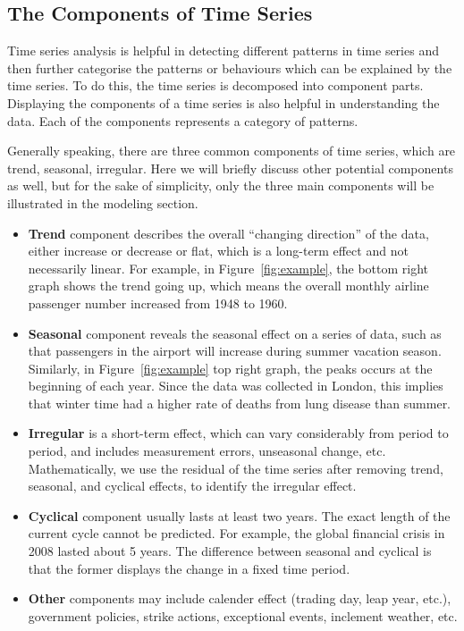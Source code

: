\subsection{The Components of Time Series}
Time series analysis is helpful in detecting different patterns in time series and then further categorise the patterns or behaviours which can be explained by the time series. To do this, the time series is decomposed into component parts. Displaying the components of a time series is also helpful in understanding the data. Each of the components represents a category of patterns.

Generally speaking, there are three common components of time series, which are trend, seasonal, irregular. Here we will briefly discuss other potential components as well, but for the sake of simplicity, only the three main components will be illustrated in the modeling section. 
 \begin{itemize}[noitemsep]
    \item \textbf{Trend} component describes the overall ``changing direction'' of the data, either increase or decrease or flat, which is a long-term effect and not necessarily linear. For example, in Figure~\ref{fig:example}, the bottom right graph shows the trend going up, which means the overall monthly airline passenger number increased from 1948 to 1960.
    \item \textbf{Seasonal} component reveals the seasonal effect on a series of data, such as that passengers in the airport will increase during summer vacation season. Similarly, in Figure~\ref{fig:example} top right graph, the peaks occurs at the beginning of each year. Since the data was collected in London, this implies that winter time had a higher rate of deaths from lung disease than summer. 
    \item \textbf{Irregular} is a short-term effect, which can vary considerably from period to period, and includes measurement errors, unseasonal change, etc. Mathematically, we use the residual of the time series after removing trend, seasonal, and cyclical effects, to identify the irregular effect.
    \item \textbf{Cyclical} component usually lasts at least two years. The exact length of the current cycle cannot be predicted. For example, the global financial crisis in 2008 lasted about 5 years. The difference between seasonal and cyclical is that the former displays the change in a fixed time period. 
    \item \textbf{Other} components may include calender effect (trading day, leap year, etc.), government policies, strike actions, exceptional events, inclement weather, etc.
\end{itemize}
